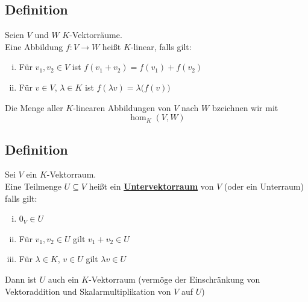 \subsection{Definition}
Seien $V$ und $W$ $K$-Vektorräume. \\
Eine Abbildung $f : V \to W$ heißt $K$-linear, falls gilt:
\begin{enumerate}[i)]
\item Für $v_1,v_2 \in V$ ist $f(v_1 +v_2)=f(v_1)+f(v_2)$
\item Für $v \in V$, $\lambda \in K$ ist $f(\lambda v )= \lambda \big(f(v)\big)$
\end{enumerate}
Die Menge aller $K$-linearen Abbildungen von $V$ nach $W$ bzeichnen wir mit \[\hom_K (V,W) \]

\subsection{Definition}
Sei $V$ ein $K$-Vektorraum. \\ Eine Teilmenge $U \subseteq V$ heißt ein \underline{\textbf{Untervektorraum}} von $V$ (oder ein Unterraum) falls gilt:
\begin{enumerate}[i)]
\item $0_V \in U$
\item Für $v_1,v_2 \in U$ gilt $v_1 + v_2 \in U$
\item Für $\lambda \in K$, $v \in U$ gilt $\lambda v \in U$
\end{enumerate}
Dann ist $U$ auch ein $K$-Vektorraum (vermöge der Einschränkung von Vektoraddition und Skalarmultiplikation von $V$ auf $U$)

